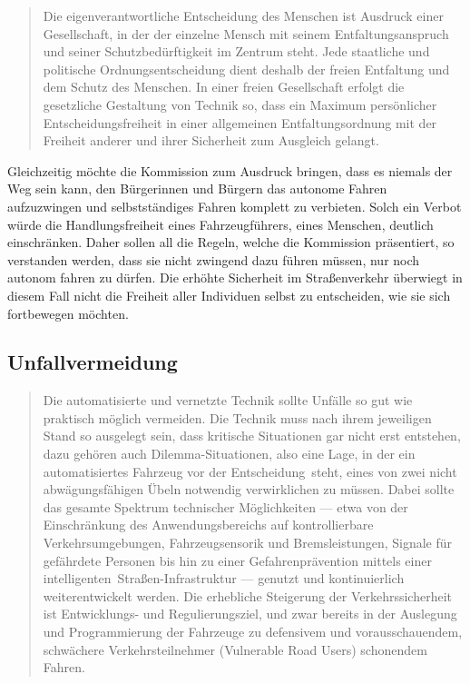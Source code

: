 \documentclass[twoside,a4paper,12pt]{article}
\begin{document}
\begin{quote}
\glqq
Die eigenverantwortliche Entscheidung des Menschen ist Ausdruck einer Gesellschaft, in
der der einzelne Mensch mit seinem Entfaltungsanspruch und seiner Schutzbedürftigkeit
im Zentrum steht. Jede staatliche und politische Ordnungsentscheidung dient deshalb
der freien Entfaltung und dem Schutz des Menschen. In einer freien Gesellschaft erfolgt
die gesetzliche Gestaltung von Technik so, dass ein Maximum persönlicher Entscheidungsfreiheit in einer allgemeinen 
Entfaltungsordnung mit der Freiheit anderer und ihrer
Sicherheit zum Ausgleich gelangt.\grqq\mbox{~\cite[S. 10]{ek}}
\end{quote}
Gleichzeitig möchte die Kommission zum Ausdruck bringen, dass es niemals der Weg sein kann, den Bürgerinnen und Bürgern das autonome Fahren aufzuzwingen und 
 selbstständiges Fahren komplett zu verbieten. Solch ein Verbot würde die Handlungsfreiheit eines Fahrzeugführers, eines Menschen, deutlich einschränken.
 Daher sollen all die Regeln, welche die Kommission präsentiert, so verstanden werden, dass sie nicht zwingend dazu führen müssen, nur noch autonom fahren zu dürfen.
 Die erhöhte Sicherheit im Straßenverkehr überwiegt in diesem Fall nicht die Freiheit aller Individuen selbst zu entscheiden, wie sie sich fortbewegen möchten.

\subsection{Unfallvermeidung} \label{Unfallvermeidung}

\begin{quote}
\glqq
Die automatisierte und vernetzte Technik sollte Unfälle so gut wie praktisch möglich vermeiden. Die Technik muss nach 
ihrem jeweiligen Stand so ausgelegt sein, dass kritische
Situationen gar nicht erst entstehen, dazu gehören auch Dilemma-Situationen, also eine
Lage, in der ein automatisiertes Fahrzeug vor der \glqq Entscheidung\grqq\ steht, eines von zwei
nicht abwägungsfähigen Übeln notwendig verwirklichen zu müssen. Dabei sollte das gesamte Spektrum technischer 
Möglichkeiten --- etwa von der Einschränkung des Anwendungsbereichs auf kontrollierbare Verkehrsumgebungen, 
Fahrzeugsensorik und Bremsleistungen, Signale für gefährdete Personen bis hin zu einer Gefahrenprävention mittels
einer \glqq intelligenten\grqq\ Straßen-Infrastruktur --- genutzt und kontinuierlich weiterentwickelt
werden. Die erhebliche Steigerung der Verkehrssicherheit ist Entwicklungs- und Regulierungsziel, und zwar bereits in der 
Auslegung und Programmierung der Fahrzeuge zu defensivem und vorausschauendem, schwächere Verkehrsteilnehmer (\glqq Vulnerable Road
Users\grqq) schonendem Fahren.\grqq\mbox{~\cite[S. 10]{ek}}
\end{quote}
\end{document}
